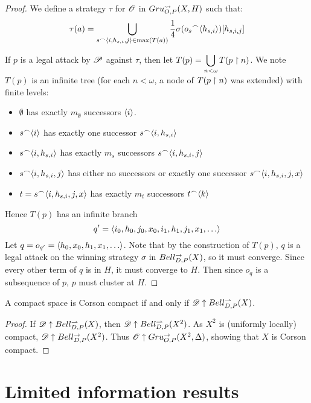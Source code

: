 \begin{proof}
  We define a strategy $\tau$ for $\mathscr{O}$ in $Gru_{O,P}^{\leadsto}(X,H)$ such
  that:
  \[
    \tau(a)
      =
    \bigcup_{s{^\frown}\langle i,h_{s,i},j\rangle\in\max(T(a))}
    \frac{1}{4}\sigma(o_s{^\frown}\langle h_{s,i}\rangle)[h_{s,i,j}]
  \]

  If $p$ is a legal attack by $\mathscr{P}$ against $\tau$, then
  let $\displaystyle T(p)=\bigcup_{n<\omega} T(p\restriction n)$. We note $T(p)$ is an infinite
  tree (for each $n<\omega$, a node of $T(p\restriction n)$ was extended)
  with finite levels:
    \begin{itemize}
      \item $\emptyset$ has exactly $m_\emptyset$ successors $\langle i\rangle$.
      \item $s{^\frown}\langle i\rangle$ has exactly one successor $s{^\frown}\langle i,h_{s,i}\rangle$
      \item $s{^\frown}\langle i,h_{s,i}\rangle$ has exactly $m_s$ successors
            $s{^\frown}\langle i,h_{s,i},j\rangle$
      \item $s{^\frown}\langle i,h_{s,i},j\rangle$ has either no successors or exactly
            one successor $s{^\frown}\langle i,h_{s,i},j,x\rangle$
      \item $t=s{^\frown}\langle i,h_{s,i},j,x\rangle$ has exactly $m_t$ successors
            $t{^\frown}\langle k\rangle$
    \end{itemize}

  Hence $T(p)$ has an infinite branch
    \[
      q'=\<i_0,h_0,j_0,x_0,i_1,h_1,j_1,x_1,\dots\>
    \]
  Let $q=o_{q'}=\<h_0,x_0,h_1,x_1,\dots\>$. Note that by the construction of
  $T(p)$, $q$ is a legal attack on the winning strategy $\sigma$ in
  $Bell_{D,P}^{\to}(X)$, so it must converge. Since every other term of $q$ is
  in $H$, it must converge to $H$. Then since $o_q$ is a subsequence of $p$,
  $p$ must cluster at $H$.
\end{proof}


\begin{thm}
  A compact space is Corson compact if and only if
  $\mathscr{D} \uparrow Bell_{D,P}^{\rightharpoonup}(X)$.
\end{thm}

\begin{proof}
  If $\mathscr{D} \uparrow Bell_{D,P}^{\rightharpoonup}(X)$, then $\mathscr{D} \uparrow Bell_{D,P}^{\rightharpoonup}(X^2)$.
  As $X^2$ is (uniformly locally) compact, $\mathscr{D} \uparrow Bell_{D,P}^{\to}(X^2)$.
  Thus $\mathscr{O}\uparrow Gru_{O,P}^{\to}(X^2,\Delta)$, showing that $X$ is Corson compact.
\end{proof}



\section{Limited information results}

